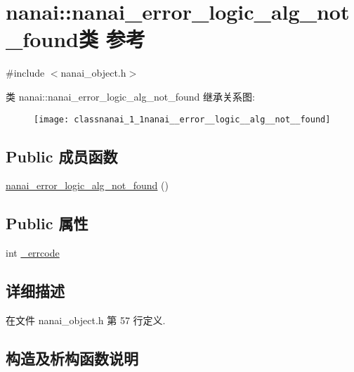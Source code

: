 \hypertarget{classnanai_1_1nanai__error__logic__alg__not__found}{}\section{nanai\+:\+:nanai\+\_\+error\+\_\+logic\+\_\+alg\+\_\+not\+\_\+found类 参考}
\label{classnanai_1_1nanai__error__logic__alg__not__found}


{\ttfamily \#include $<$nanai\+\_\+object.\+h$>$}

类 nanai\+:\+:nanai\+\_\+error\+\_\+logic\+\_\+alg\+\_\+not\+\_\+found 继承关系图\+:\begin{figure}[H]
\begin{center}
\leavevmode
\texttt{[image: classnanai\_1\_1nanai\_\_error\_\_logic\_\_alg\_\_not\_\_found]}
\end{center}
\end{figure}
\subsection*{Public 成员函数}
\begin{DoxyCompactItemize}
\item 
\hyperlink{classnanai_1_1nanai__error__logic__alg__not__found_a37482f1286e3edda3e41e8db08be3899}{nanai\+\_\+error\+\_\+logic\+\_\+alg\+\_\+not\+\_\+found} ()
\end{DoxyCompactItemize}
\subsection*{Public 属性}
\begin{DoxyCompactItemize}
\item 
int \hyperlink{classnanai_1_1nanai__error__logic__alg__not__found_a7701cdbe37605cdaebce0e8a6195e8d9}{\+\_\+errcode}
\end{DoxyCompactItemize}


\subsection{详细描述}


在文件 nanai\+\_\+object.\+h 第 57 行定义.



\subsection{构造及析构函数说明}
\hypertarget{classnanai_1_1nanai__error__logic__alg__not__found_a37482f1286e3edda3e41e8db08be3899}{}
